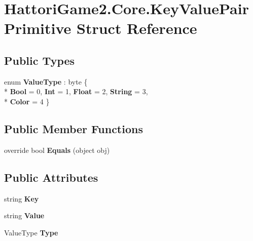 \hypertarget{struct_hattori_game2_1_1_core_1_1_key_value_pair_primitive}{}\section{Hattori\+Game2.\+Core.\+Key\+Value\+Pair\+Primitive Struct Reference}
\label{struct_hattori_game2_1_1_core_1_1_key_value_pair_primitive}
\subsection*{Public Types}
\begin{DoxyCompactItemize}
\item 
\hypertarget{struct_hattori_game2_1_1_core_1_1_key_value_pair_primitive_ac00c92284fbbb9283af400822ce3c683}{}enum {\bfseries Value\+Type} \+: byte \{ \\*
{\bfseries Bool} = 0, 
{\bfseries Int} = 1, 
{\bfseries Float} = 2, 
{\bfseries String} = 3, 
\\*
{\bfseries Color} = 4
 \}\label{struct_hattori_game2_1_1_core_1_1_key_value_pair_primitive_ac00c92284fbbb9283af400822ce3c683}

\end{DoxyCompactItemize}
\subsection*{Public Member Functions}
\begin{DoxyCompactItemize}
\item 
\hypertarget{struct_hattori_game2_1_1_core_1_1_key_value_pair_primitive_ad57ca3339b3690fd6b305470f19789f5}{}override bool {\bfseries Equals} (object obj)\label{struct_hattori_game2_1_1_core_1_1_key_value_pair_primitive_ad57ca3339b3690fd6b305470f19789f5}

\end{DoxyCompactItemize}
\subsection*{Public Attributes}
\begin{DoxyCompactItemize}
\item 
\hypertarget{struct_hattori_game2_1_1_core_1_1_key_value_pair_primitive_aab8262896fb0e1f9cc09cf0adbbbd9e1}{}string {\bfseries Key}\label{struct_hattori_game2_1_1_core_1_1_key_value_pair_primitive_aab8262896fb0e1f9cc09cf0adbbbd9e1}

\item 
\hypertarget{struct_hattori_game2_1_1_core_1_1_key_value_pair_primitive_a1213cc2d3614d2f1d8c6fe3215b1d7ee}{}string {\bfseries Value}\label{struct_hattori_game2_1_1_core_1_1_key_value_pair_primitive_a1213cc2d3614d2f1d8c6fe3215b1d7ee}

\item 
\hypertarget{struct_hattori_game2_1_1_core_1_1_key_value_pair_primitive_ae7c839752c390bc0fa1e3631b1116126}{}Value\+Type {\bfseries Type}\label{struct_hattori_game2_1_1_core_1_1_key_value_pair_primitive_ae7c839752c390bc0fa1e3631b1116126}

\end{DoxyCompactItemize}
